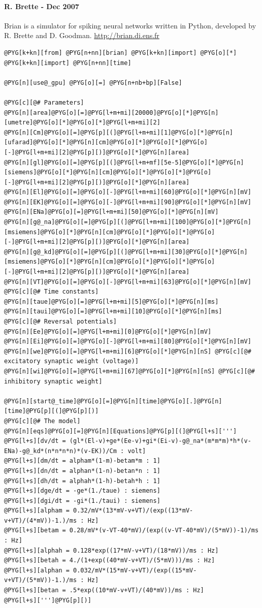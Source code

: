 \documentclass[letterpaper,10pt,english]{manual}
\begin{document}
\paragraph{R. Brette - Dec 2007}

Brian is a simulator for spiking neural networks written in Python, developed by
R. Brette and D. Goodman.
\href{http://brian.di.ens.fr}{http://brian.di.ens.fr}

\begin{Verbatim}[commandchars=@\[\]]
@PYG[k+kn][from] @PYG[n+nn][brian] @PYG[k+kn][import] @PYG[o][*]
@PYG[k+kn][import] @PYG[n+nn][time]

@PYG[n][use@_gpu] @PYG[o][=] @PYG[n+nb+bp][False]

@PYG[c][@# Parameters]
@PYG[n][area]@PYG[o][=]@PYG[l+m+mi][20000]@PYG[o][*]@PYG[n][umetre]@PYG[o][*]@PYG[o][*]@PYG[l+m+mi][2]
@PYG[n][Cm]@PYG[o][=]@PYG[p][(]@PYG[l+m+mi][1]@PYG[o][*]@PYG[n][ufarad]@PYG[o][*]@PYG[n][cm]@PYG[o][*]@PYG[o][*]@PYG[o][-]@PYG[l+m+mi][2]@PYG[p][)]@PYG[o][*]@PYG[n][area]
@PYG[n][gl]@PYG[o][=]@PYG[p][(]@PYG[l+m+mf][5e-5]@PYG[o][*]@PYG[n][siemens]@PYG[o][*]@PYG[n][cm]@PYG[o][*]@PYG[o][*]@PYG[o][-]@PYG[l+m+mi][2]@PYG[p][)]@PYG[o][*]@PYG[n][area]
@PYG[n][El]@PYG[o][=]@PYG[o][-]@PYG[l+m+mi][60]@PYG[o][*]@PYG[n][mV]
@PYG[n][EK]@PYG[o][=]@PYG[o][-]@PYG[l+m+mi][90]@PYG[o][*]@PYG[n][mV]
@PYG[n][ENa]@PYG[o][=]@PYG[l+m+mi][50]@PYG[o][*]@PYG[n][mV]
@PYG[n][g@_na]@PYG[o][=]@PYG[p][(]@PYG[l+m+mi][100]@PYG[o][*]@PYG[n][msiemens]@PYG[o][*]@PYG[n][cm]@PYG[o][*]@PYG[o][*]@PYG[o][-]@PYG[l+m+mi][2]@PYG[p][)]@PYG[o][*]@PYG[n][area]
@PYG[n][g@_kd]@PYG[o][=]@PYG[p][(]@PYG[l+m+mi][30]@PYG[o][*]@PYG[n][msiemens]@PYG[o][*]@PYG[n][cm]@PYG[o][*]@PYG[o][*]@PYG[o][-]@PYG[l+m+mi][2]@PYG[p][)]@PYG[o][*]@PYG[n][area]
@PYG[n][VT]@PYG[o][=]@PYG[o][-]@PYG[l+m+mi][63]@PYG[o][*]@PYG[n][mV]
@PYG[c][@# Time constants]
@PYG[n][taue]@PYG[o][=]@PYG[l+m+mi][5]@PYG[o][*]@PYG[n][ms]
@PYG[n][taui]@PYG[o][=]@PYG[l+m+mi][10]@PYG[o][*]@PYG[n][ms]
@PYG[c][@# Reversal potentials]
@PYG[n][Ee]@PYG[o][=]@PYG[l+m+mi][0]@PYG[o][*]@PYG[n][mV]
@PYG[n][Ei]@PYG[o][=]@PYG[o][-]@PYG[l+m+mi][80]@PYG[o][*]@PYG[n][mV]
@PYG[n][we]@PYG[o][=]@PYG[l+m+mi][6]@PYG[o][*]@PYG[n][nS] @PYG[c][@# excitatory synaptic weight (voltage)]
@PYG[n][wi]@PYG[o][=]@PYG[l+m+mi][67]@PYG[o][*]@PYG[n][nS] @PYG[c][@# inhibitory synaptic weight]

@PYG[n][start@_time]@PYG[o][=]@PYG[n][time]@PYG[o][.]@PYG[n][time]@PYG[p][(]@PYG[p][)]
@PYG[c][@# The model]
@PYG[n][eqs]@PYG[o][=]@PYG[n][Equations]@PYG[p][(]@PYG[l+s][''']
@PYG[l+s][dv/dt = (gl*(El-v)+ge*(Ee-v)+gi*(Ei-v)-g@_na*(m*m*m)*h*(v-ENa)-g@_kd*(n*n*n*n)*(v-EK))/Cm : volt]
@PYG[l+s][dm/dt = alpham*(1-m)-betam*m : 1]
@PYG[l+s][dn/dt = alphan*(1-n)-betan*n : 1]
@PYG[l+s][dh/dt = alphah*(1-h)-betah*h : 1]
@PYG[l+s][dge/dt = -ge*(1./taue) : siemens]
@PYG[l+s][dgi/dt = -gi*(1./taui) : siemens]
@PYG[l+s][alpham = 0.32/mV*(13*mV-v+VT)/(exp((13*mV-v+VT)/(4*mV))-1.)/ms : Hz]
@PYG[l+s][betam = 0.28/mV*(v-VT-40*mV)/(exp((v-VT-40*mV)/(5*mV))-1)/ms : Hz]
@PYG[l+s][alphah = 0.128*exp((17*mV-v+VT)/(18*mV))/ms : Hz]
@PYG[l+s][betah = 4./(1+exp((40*mV-v+VT)/(5*mV)))/ms : Hz]
@PYG[l+s][alphan = 0.032/mV*(15*mV-v+VT)/(exp((15*mV-v+VT)/(5*mV))-1.)/ms : Hz]
@PYG[l+s][betan = .5*exp((10*mV-v+VT)/(40*mV))/ms : Hz]
@PYG[l+s][''']@PYG[p][)]


\end{Verbatim}
\end{document}
